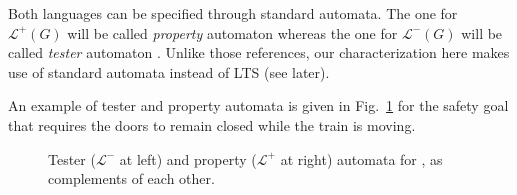 Both languages can be specified through standard automata. The one for $\mathcal{L}^{+}(G)$ will be called \emph{property} automaton \cite{Letier:2005} whereas the one for $\mathcal{L}^{-}(G)$ will be called \emph{tester} automaton \cite{Giannakopoulou:2003}. Unlike those references, our characterization here makes use of standard automata instead of LTS (see later).

An example of tester and property automata is given in Fig.~\ref{image:tester-and-property-automata} for the safety goal that requires the doors to remain closed while the train is moving.
\begin{figure}\centering
{}
\caption{Tester ($\mathcal{L}^{-}$ at left) and property ($\mathcal{L}^{+}$ at right) automata for , as complements of each other.\label{image:tester-and-property-automata}}
\end{figure}

